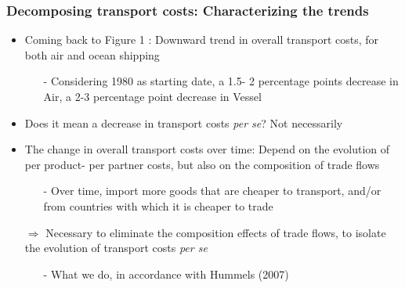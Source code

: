 \documentclass[10 pt,Helvetica, french]{beamer}
\begin{document}
\begin{frame}[label=slide_moreonfig1]
\frametitle{Decomposing transport costs: Characterizing the trends}
\begin{itemize}
\item Coming back to Figure 1 \hyperlink{slide_fig1}{}: Downward trend in overall transport costs, for both air and ocean shipping \vspace{0.1cm}
\begin{itemize}
\item[-] Considering 1980 as starting date, a 1.5- 2 percentage points decrease in Air, a 2-3 percentage point decrease in Vessel \vspace{0.1cm}
\end{itemize}
\item Does it mean a decrease in transport costs \textit{per se}? Not necessarily \vspace{0.1cm}
\item The change in overall transport costs over time: Depend on the evolution of per product- per partner costs, but also on the composition of trade flows \vspace{0.1cm}
\begin{itemize}
\item[-] Over time, import more goods that are cheaper to transport, and/or from countries with which it is cheaper to trade \vspace{0.1cm}
\end{itemize}
\item[$\Rightarrow$] Necessary to eliminate the composition effects of trade flows, to isolate the evolution of transport costs \textit{per se}  \vspace{0.1cm}
    \begin{itemize}
\item[-] What we do, in accordance with Hummels (2007) \hyperlink{app_compositioneffects}{}
\end{itemize}
\end{itemize}
\end{frame}
\end{document}
